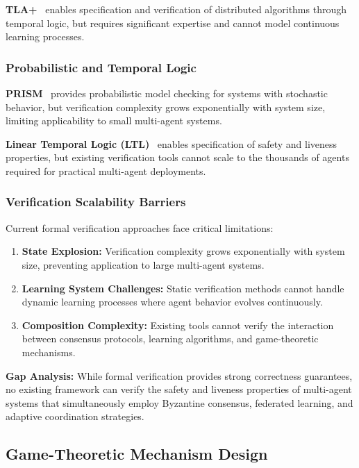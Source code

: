 \documentclass[conference]{IEEEtran}
\begin{document}
\textbf{TLA+}~\cite{lamport2002specifying} enables specification and verification of distributed algorithms through temporal logic, but requires significant expertise and cannot model continuous learning processes.

\subsubsection{Probabilistic and Temporal Logic}

\textbf{PRISM}~\cite{kwiatkowska2011prism} provides probabilistic model checking for systems with stochastic behavior, but verification complexity grows exponentially with system size, limiting applicability to small multi-agent systems.

\textbf{Linear Temporal Logic (LTL)}~\cite{pnueli1977temporal} enables specification of safety and liveness properties, but existing verification tools cannot scale to the thousands of agents required for practical multi-agent deployments.

\subsubsection{Verification Scalability Barriers}

Current formal verification approaches face critical limitations:

\begin{enumerate}
    \item \textbf{State Explosion:} Verification complexity grows exponentially with system size, preventing application to large multi-agent systems.
    
    \item \textbf{Learning System Challenges:} Static verification methods cannot handle dynamic learning processes where agent behavior evolves continuously.
    
    \item \textbf{Composition Complexity:} Existing tools cannot verify the interaction between consensus protocols, learning algorithms, and game-theoretic mechanisms.
\end{enumerate}

\textbf{Gap Analysis:} While formal verification provides strong correctness guarantees, no existing framework can verify the safety and liveness properties of multi-agent systems that simultaneously employ Byzantine consensus, federated learning, and adaptive coordination strategies.

\subsection{Game-Theoretic Mechanism Design}
\end{document}
